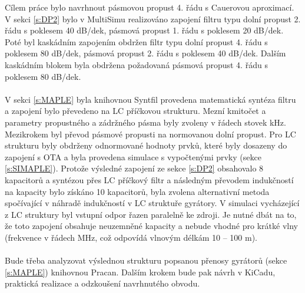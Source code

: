 \noindent Cílem práce bylo navrhnout pásmovou propust 4. řádu s Cauerovou aproximací. V sekci \ref{s:DP2} bylo v MultiSimu realizováno zapojení filtru typu dolní propust 2. řádu s poklesem 40 dB/dek, pásmová propust 1. řádu s poklesem 20 dB/dek. Poté byl kaskádním zapojením obdržen filtr typu dolní propust 4. řádu s poklesem 80 dB/dek, pásmová propust 2. řádu s poklesem 40 dB/dek. Dalším kaskádním blokem byla obdržena požadovaná pásmová propust 4. řádu s poklesem 80 dB/dek.\\
\\
V sekci \ref{s:MAPLE} byla knihovnou Syntfil provedena matematická syntéza filtru a zapojení bylo převedeno na LC příčkovou strukturu. Mezní kmitočet a parametry propustného a zádržného pásma byly zvoleny v řádech stovek kHz. Mezikrokem byl převod pásmové propusti na normovanou dolní propust. Pro LC strukturu byly obdrženy odnormované hodnoty prvků, které byly dosazeny do zapojení s OTA a byla provedena simulace s vypočtenými prvky (sekce \ref{s:SIMAPLE}). Protože výsledné zapojení ze sekce \ref{s:DP2} obsahovalo 8 kapacitorů a syntézou přes LC příčkový filtr a následným převodem indukčností na kapacity bylo získáno 10 kapacitorů, byla zvolena alternativní metoda spočívající v náhradě indukčností v LC struktuře gyrátory. V simulaci vycházející z LC struktury byl vstupní odpor řazen paralelně ke zdroji. Je nutné dbát na to, že toto zapojení obsahuje neuzemněné kapacity a nebude vhodné pro krátké vlny (frekvence v řádech MHz, což odpovídá vlnovým délkám 10 -- 100 m). \\
\\
Bude třeba analyzovat výslednou strukturu popsanou přenosy gyrátorů (sekce \ref{s:MAPLE}) knihovnou Pracan. Dalším krokem bude pak návrh v KiCadu, praktická realizace a odzkoušení navrhnutého obvodu.